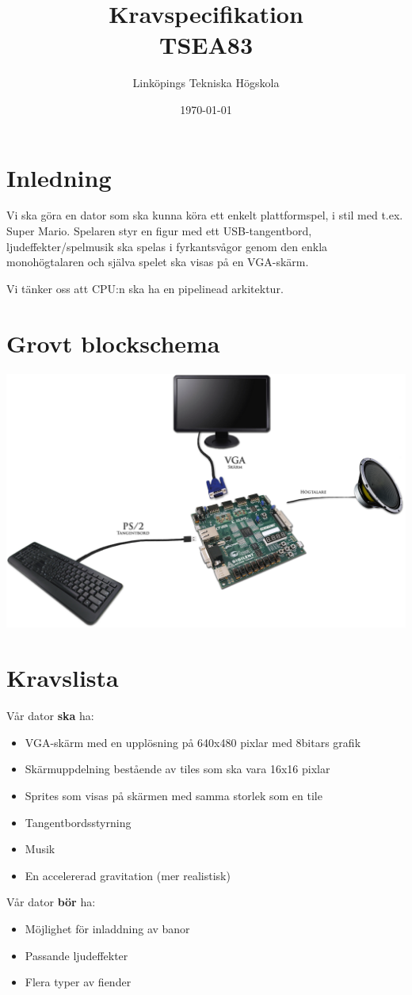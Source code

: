 \documentclass[a4paper,titlepage]{article}
\title{
\textbf{Kravspecifikation} \\
\large TSEA83}
\date{\today}
\author{Linköpings Tekniska Högskola}
\begin{document}
	\maketitle
	\newpage

\section{Inledning}
Vi ska göra en dator som ska kunna köra ett enkelt plattformspel, 
i stil med t.ex. Super Mario. Spelaren styr en figur med ett USB-tangentbord,
ljudeffekter/spelmusik ska spelas i fyrkantsvågor genom den enkla 
monohögtalaren och själva spelet ska visas på en VGA-skärm.

Vi tänker oss att CPU:n ska ha en pipelinead arkitektur.

\section{Grovt blockschema}
\includegraphics[width=14cm]{blockschema.png}

\section{Kravslista}
Vår dator \textbf{ska} ha:
\begin{itemize}
    \item VGA-skärm med en upplösning på 640x480 pixlar med 8bitars grafik
    \item Skärmuppdelning bestående av tiles som ska vara 16x16 pixlar
    \item Sprites som visas på skärmen med samma storlek som en tile
	\item Tangentbordsstyrning
    \item Musik
    \item En accelererad gravitation (mer realistisk)
\end{itemize}
Vår dator \textbf{bör} ha:
\begin{itemize}
	\item Möjlighet för inladdning av banor
	\item Passande ljudeffekter 
	\item Flera typer av fiender
\end{itemize}
\end{document}
